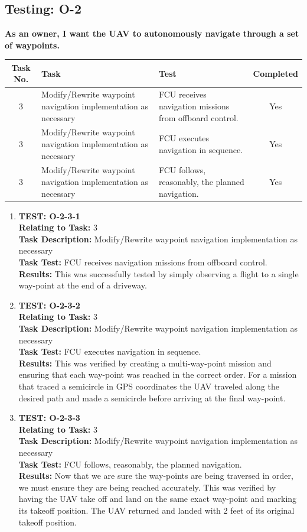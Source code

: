 \newpage
\subsection{Testing: O-2}
\textbf{As an owner, I want the UAV to autonomously navigate through a set of waypoints.}\\
\begin{tabular}{| c | >{\raggedright}m{4cm} | m{4cm} | c |}\hline
	Task No. & Task & Test & Completed\\\hline
	3 & Modify/Rewrite waypoint navigation implementation as necessary & FCU receives navigation missions from offboard control. & Yes\\\hline
	3 & Modify/Rewrite waypoint navigation implementation as necessary & FCU executes navigation in sequence. & Yes\\\hline
	3 & Modify/Rewrite waypoint navigation implementation as necessary & FCU follows, reasonably, the planned navigation. & Yes\\\hline
\end{tabular}

\begin{enumerate}
\item \textbf{TEST: O-2-3-1}\\
\textbf{Relating to Task:} 3\\
\textbf{Task Description:} Modify/Rewrite waypoint navigation implementation as necessary\\
\textbf{Task Test:} FCU receives navigation missions from offboard control.\\
\textbf{Results:} This was successfully tested by simply observing a flight to a single way-point at the end of a driveway.

\item \textbf{TEST: O-2-3-2}\\
\textbf{Relating to Task:} 3\\
\textbf{Task Description:} Modify/Rewrite waypoint navigation implementation as necessary \\
\textbf{Task Test:} FCU executes navigation in sequence.\\
\textbf{Results:} This was verified by creating a multi-way-point mission and ensuring that each way-point was reached in the correct order. For a mission that traced a semicircle in GPS coordinates the UAV traveled along the desired path and made a semicircle before arriving at the final way-point.

\item \textbf{TEST: O-2-3-3}\\
\textbf{Relating to Task:} 3\\
\textbf{Task Description:} Modify/Rewrite waypoint navigation implementation as necessary \\
\textbf{Task Test:} FCU follows, reasonably, the planned navigation.\\
\textbf{Results:} Now that we are sure the way-points are being traversed in order, we must ensure they are being reached accurately. This was verified by having the UAV take off and land on the same exact way-point and marking its takeoff position. The UAV returned and landed with 2 feet of its original takeoff position.
\end{enumerate}

